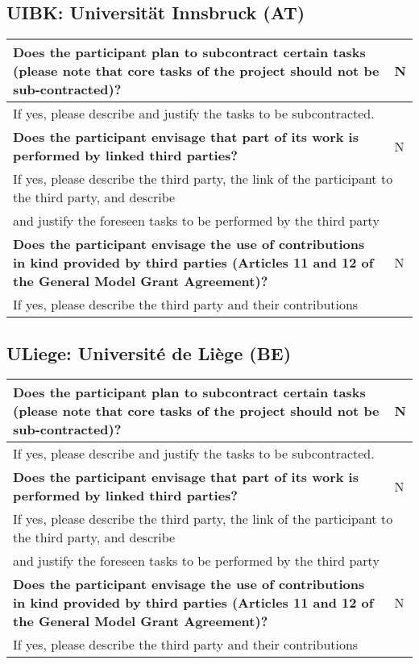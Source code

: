 \subsection{UIBK: Universität Innsbruck (AT)}

\begin{longtable}{|p{}|p{}|}
\hline
{\bf Does the participant plan to subcontract certain tasks (please
  note that core tasks of the project should not be sub-contracted)?}
&
N
\\
\hline
\multicolumn{2}{|l|}{
If yes, please describe and justify the tasks to be subcontracted.}
\\
\hline
{\bf Does the participant envisage that  part of its work is performed
  by linked third parties?}
&
N
\\
\hline
\multicolumn{2}{|l|}{If yes, please describe the third party, the link of the
  participant to the third party, and describe}\\
\multicolumn{2}{|l|}{and justify the foreseen
tasks to be performed by the third party}
\\
\hline
{\bf Does the participant envisage the use of contributions in kind
provided by third parties (Articles 11 and 12 of the General Model
Grant Agreement)?}
&
N
\\
\hline
\multicolumn{2}{|l|}{If yes, please describe the third party and their contributions}
\\
\hline
\end{longtable}

\subsection{ULiege: Université de Liège (BE)}

\begin{longtable}{|p{}|p{}|}
\hline
{\bf Does the participant plan to subcontract certain tasks (please
  note that core tasks of the project should not be sub-contracted)?}
&
N
\\
\hline
\multicolumn{2}{|l|}{
If yes, please describe and justify the tasks to be subcontracted.}
\\
\hline
{\bf Does the participant envisage that  part of its work is performed
  by linked third parties?}
&
N
\\
\hline
\multicolumn{2}{|l|}{If yes, please describe the third party, the link of the
  participant to the third party, and describe}\\
\multicolumn{2}{|l|}{and justify the foreseen
tasks to be performed by the third party}
\\
\hline
{\bf Does the participant envisage the use of contributions in kind
provided by third parties (Articles 11 and 12 of the General Model
Grant Agreement)?}
&
N
\\
\hline
\multicolumn{2}{|l|}{If yes, please describe the third party and their contributions}
\\
\hline
\end{longtable}

